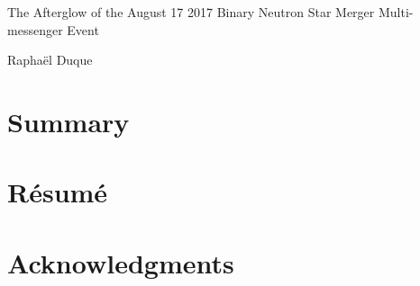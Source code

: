 \begin{center}

{\huge The Afterglow of the August 17 2017 Binary Neutron Star Merger Multi-messenger Event}

Raphaël Duque

\end{center}

\newpage

\section*{Summary}


\vfill

\section*{Résumé}

\newpage

\section*{Acknowledgments}
